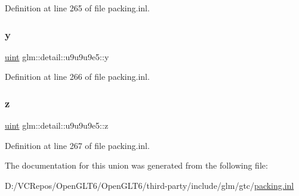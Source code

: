 Definition at line 265 of file packing.\+inl.

\mbox{\label{unionglm_1_1detail_1_1u9u9u9e5_ae11f1138214a146e8462f2c022350254}} 
\subsubsection{\texorpdfstring{y}{y}}
{\footnotesize\ttfamily \mbox{\hyperlink{group__core__precision_ga4fd29415871152bfb5abd588334147c8}{uint}} glm\+::detail\+::u9u9u9e5\+::y}



Definition at line 266 of file packing.\+inl.

\mbox{\label{unionglm_1_1detail_1_1u9u9u9e5_a9eacfe6494175ce78b6e516746bb63b7}} 
\subsubsection{\texorpdfstring{z}{z}}
{\footnotesize\ttfamily \mbox{\hyperlink{group__core__precision_ga4fd29415871152bfb5abd588334147c8}{uint}} glm\+::detail\+::u9u9u9e5\+::z}



Definition at line 267 of file packing.\+inl.



The documentation for this union was generated from the following file\+:\begin{DoxyCompactItemize}
\item 
D\+:/\+V\+C\+Repos/\+Open\+G\+L\+T6/\+Open\+G\+L\+T6/third-\/party/include/glm/gtc/\mbox{\hyperlink{packing_8inl}{packing.\+inl}}\end{DoxyCompactItemize}
